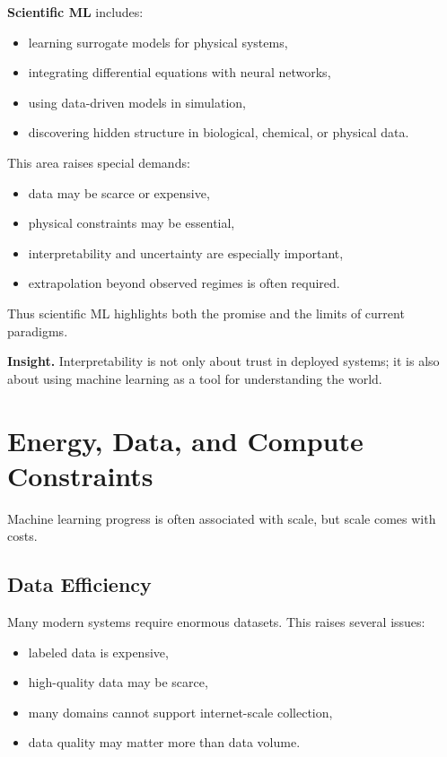 \medskip

\noindent
\textbf{Scientific ML} includes:
\begin{itemize}
    \item learning surrogate models for physical systems,
    \item integrating differential equations with neural networks,
    \item using data-driven models in simulation,
    \item discovering hidden structure in biological, chemical, or physical data.
\end{itemize}

\medskip

\noindent
This area raises special demands:
\begin{itemize}
    \item data may be scarce or expensive,
    \item physical constraints may be essential,
    \item interpretability and uncertainty are especially important,
    \item extrapolation beyond observed regimes is often required.
\end{itemize}

\medskip

\noindent
Thus scientific ML highlights both the promise and the limits of current paradigms.

\medskip

\noindent
\textbf{Insight.}
Interpretability is not only about trust in deployed systems; it is also about using machine learning as a tool for understanding the world.

\section{Energy, Data, and Compute Constraints}

Machine learning progress is often associated with scale, but scale comes with costs.

\subsection{Data Efficiency}

Many modern systems require enormous datasets. This raises several issues:
\begin{itemize}
    \item labeled data is expensive,
    \item high-quality data may be scarce,
    \item many domains cannot support internet-scale collection,
    \item data quality may matter more than data volume.
\end{itemize}

